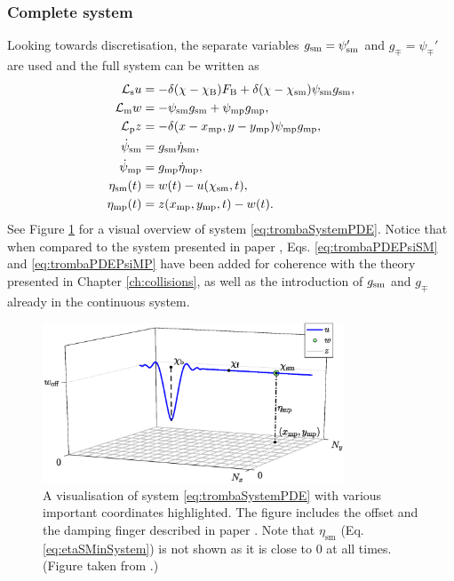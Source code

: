 \subsubsection{Complete system}
Looking towards discretisation, the separate variables $g_{\text{sm}}=\psi_{\text{sm}}'$ and $g_\mp=\psi_\mp'$ are used and the full system can be written as 
\begin{subequations}\label{eq:trombaSystemPDE}
    \begin{align}
        \mathcal{L}_\text{s}u &= -\delta(\chi-\chi_{\text{B}})F_{\text{B}} + \delta(\chi - \chi_{\text{sm}})\psi_{\text{sm}} g_{\text{sm}},\\
        \mathcal{L}_\text{m}w &= - \psi_{\text{sm}} g_{\text{sm}} + \psi_{\text{mp}} g_{\text{mp}},\\
        \mathcal{L}_\text{p}z &= -\delta(x-x_{\text{mp}}, y-y_{\text{mp}})\psi_{\text{mp}} g_{\text{mp}},\\
        \dot\psi_{\text{sm}} &= g_{\text{sm}} \dot \eta_{\text{sm}},\label{eq:trombaPDEPsiSM}\\
        \dot\psi_{\text{mp}} &= g_{\text{mp}} \dot \eta_{\text{mp}},\label{eq:trombaPDEPsiMP}\\
        \eta_{\text{sm}}(t) &= w(t) - u(\chi_{\text{sm}}, t),\label{eq:etaSMinSystem}\\
        \eta_{\text{mp}}(t) &= z(x_{\text{mp}}, y_{\text{mp}}, t) - w(t).
    \end{align}
\end{subequations}
See Figure \ref{fig:trombaSystem} for a visual overview of system \eqref{eq:trombaSystemPDE}. Notice that when compared to the system presented in paper \citeP[D], Eqs. \eqref{eq:trombaPDEPsiSM} and \eqref{eq:trombaPDEPsiMP} have been added for coherence with the theory presented in Chapter \ref{ch:collisions}, as well as the introduction of $g_{\text{sm}}$ and $g_\mp$ already in the continuous system. 

\begin{figure}[h]
    \centering
    \includegraphics[width=0.8\textwidth]{figures/contributions/tromba/trombaSystem.eps}
    \caption{A visualisation of system \eqref{eq:trombaSystemPDE} with various important coordinates highlighted. The figure includes the offset and the damping finger described in paper \citeP[D]. Note that $\eta_\text{sm}$ (Eq. \eqref{eq:etaSMinSystem}) is not shown as it is close to 0 at all times. (Figure taken from \citeP[D].)}
    \label{fig:trombaSystem}
  \end{figure}

